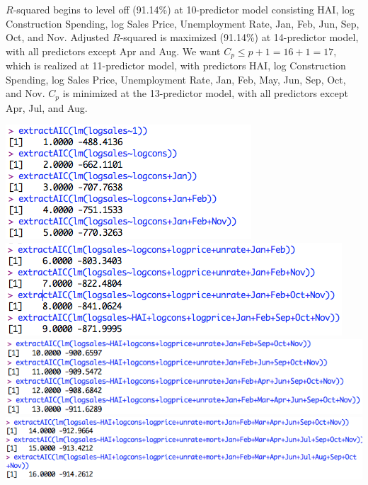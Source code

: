 \documentclass[a4 paper, 11 pt]{article}
\begin{document}
$R$-squared begins to level off (91.14\%) at 10-predictor model consisting HAI, log Construction Spending, log Sales Price, Unemployment Rate, Jan, Feb, Jun, Sep, Oct, and Nov. Adjusted $R$-squared is maximized (91.14\%) at 14-predictor model, with all predictors except Apr and Aug. We want $C_p \le p+1 = 16+1 = 17$, which is realized at 11-predictor model, with predictors HAI, log Construction Spending, log Sales Price, Unemployment Rate, Jan, Feb, May, Jun, Sep, Oct, and Nov. $C_p$ is minimized at the 13-predictor model, with all predictors except Apr, Jul, and Aug.
\begin{center}
\includegraphics[scale=0.4]{AIC1}\\
\includegraphics[scale=0.4]{AIC2}\\
\includegraphics[scale=0.4]{AIC3}\\
\includegraphics[scale=0.4]{AIC4}\\

\end{center}
\end{document}
